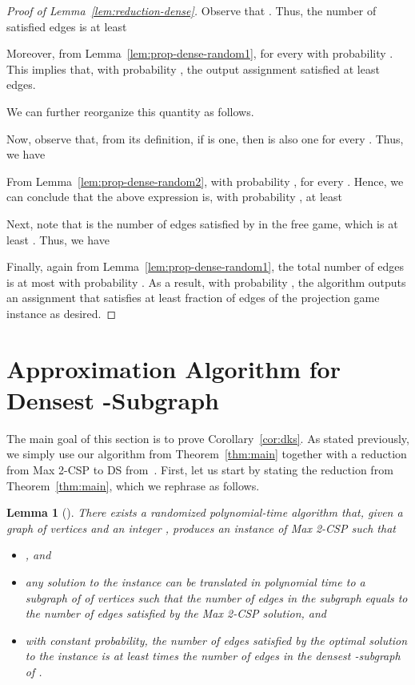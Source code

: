 \documentclass{article}
\newtheorem{lemma}{Lemma}
\begin{document}
\begin{proof}[Proof of Lemma~\ref{lem:reduction-dense}]
Observe that . Thus, the number of satisfied edges is at least


Moreover, from Lemma~\ref{lem:prop-dense-random1},  for every  with probability . This implies that, with probability , the output assignment satisfied at least  edges.

We can further reorganize this quantity as follows.


Now, observe that, from its definition, if  is one, then  is also one for every . Thus, we have


From Lemma~\ref{lem:prop-dense-random2}, with probability ,  for every . Hence, we can conclude that the above expression is, with probability , at least


Next, note that  is the number of edges satisfied by  in the free game, which is at least . Thus, we have

Finally, again from Lemma~\ref{lem:prop-dense-random1}, the total number of edges is at most  with probability . As a result, with probability , the algorithm outputs an assignment that satisfies at least  fraction of edges of the projection game instance as desired.
\end{proof}

\section{Approximation Algorithm for Densest -Subgraph}

The main goal of this section is to prove Corollary~\ref{cor:dks}. As stated previously, we simply use our algorithm from Theorem~\ref{thm:main} together with a reduction from {\sc Max 2-CSP} to {\sc DS} from~\cite{CHK}. First, let us start by stating the reduction from Theorem~\ref{thm:main}, which we rephrase as follows. \\

\begin{lemma}[\cite{CHK}] \label{lem:dks-reduction}
  There exists a randomized polynomial-time algorithm that, given a graph  of  vertices and an integer , produces an instance  of {\sc Max 2-CSP} such that
  \begin{itemize}
  \item , and
  \item any solution to the instance can be translated in polynomial time to a subgraph of  of  vertices such that the number of edges in the subgraph equals to the number of edges satisfied by the {\sc Max 2-CSP} solution, and
  \item with constant probability, the number of edges satisfied by the optimal solution to the instance is at least  times the number of edges in the densest -subgraph of .
  \end{itemize}
\end{lemma}
\end{document}
